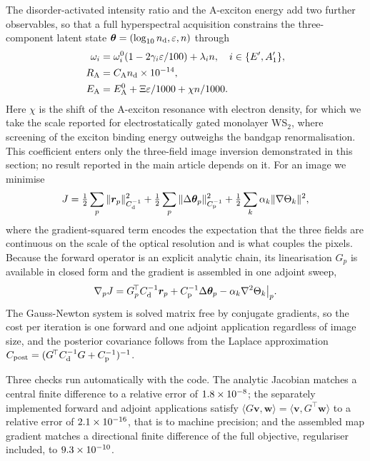 \documentclass[aip,apl,amsmath,amssymb,reprint,longbibliography]{revtex4-1}
\begin{document}
The disorder-activated intensity ratio and the A-exciton energy add two
further observables, so that a full hyperspectral acquisition constrains the
three-component latent state
$\bm\theta=(\log_{10}n_{\rm d},\varepsilon,n)$ through
\begin{align}
\omega_i &= \omega_i^0(1-2\gamma_i\varepsilon/100)+\lambda_in,
\quad i\in\{E',A_1'\},\\
R_{\rm A} &= C_{\rm A}n_{\rm d}\times10^{-14},\\
E_{\rm A} &= E_{\rm A}^0+\Xi\varepsilon/1000+\chi n/1000 .
\end{align}
Here $\chi$ is the shift of the A-exciton resonance with electron density, for
which we take the scale reported for electrostatically gated monolayer
WS$_2$,\cite{Chernikov2015} where screening of the exciton binding energy
outweighs the bandgap renormalisation. This coefficient enters only the
three-field image inversion demonstrated in this section; no result reported in
the main article depends on it. For an image we minimise
\begin{equation}
J=\tfrac12\sum_p\|\bm r_p\|^2_{C_{\rm d}^{-1}}
+\tfrac12\sum_p\|\Delta\bm\theta_p\|^2_{C_{\rm p}^{-1}}
+\tfrac12\sum_k\alpha_k\|\nabla\Theta_k\|^2 ,
\end{equation}
where the gradient-squared term encodes the expectation that the three fields
are continuous on the scale of the optical resolution and is what couples the
pixels. Because the forward operator is an explicit analytic chain, its
linearisation $G_p$ is available in closed form and the gradient is assembled
in one adjoint sweep,\cite{Plessix2006,Stuart2010}
\begin{equation}
\nabla_pJ=G_p^{\!\top}C_{\rm d}^{-1}\bm r_p
+C_{\rm p}^{-1}\Delta\bm\theta_p-\alpha_k\nabla^2\Theta_k\big|_p .
\end{equation}
The Gauss-Newton system is solved matrix free by conjugate gradients, so the
cost per iteration is one forward and one adjoint application regardless of
image size, and the posterior covariance follows from the Laplace
approximation $C_{\rm post}=(G^{\!\top}C_{\rm d}^{-1}G+C_{\rm p}^{-1})^{-1}$.

Three checks run automatically with the code. The analytic Jacobian matches a
central finite difference to a relative error of $1.8\times 10^{-8}$; the separately
implemented forward and adjoint applications satisfy
$\langle G\bm v,\bm w\rangle=\langle\bm v,G^{\!\top}\bm w\rangle$ to a
relative error of $2.1\times 10^{-16}$, that is to machine precision; and the assembled
map gradient matches a directional finite
difference of the full objective, regulariser included, to $9.3\times 10^{-10}$.
\end{document}
